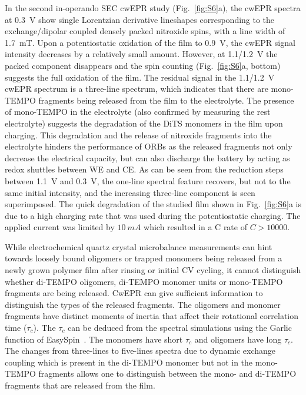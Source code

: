 \par
In the second in-operando SEC cwEPR study (Fig.~\ref{fig:S6}a), the cwEPR spectra at 0.3~V show single Lorentzian derivative lineshapes corresponding to the exchange/dipolar coupled densely packed nitroxide spins, with a line width of 1.7~mT. Upon a potentiostatic oxidation of the film to 0.9~V, the cwEPR signal intensity decreases by a relatively small amount. However, at 1.1/1.2~V the packed component disappears and the spin counting (Fig.~\ref{fig:S6}a, bottom) suggests the full oxidation of the film. The residual signal in the 1.1/1.2~V cwEPR spectrum is a three-line spectrum, which indicates that there are mono-TEMPO fragments being released from the film to the electrolyte. The presence of mono-TEMPO in the electrolyte (also confirmed by measuring the rest electrolyte) suggests the degradation of the DiTS monomers in the film upon charging. This degradation and the release of nitroxide fragments into the electrolyte hinders the performance of ORBs as the released fragments not only decrease the electrical capacity, but can also discharge the battery by acting as redox shuttles between WE and CE. As can be seen from the reduction steps between 1.1~V and 0.3~V, the one-line spectral feature recovers, but not to the same initial intensity, and the increasing three-line component is seen superimposed. The quick degradation of the studied film shown in Fig.~\ref{fig:S6}a is due to a high charging rate that was used during the potentiostatic charging. The applied current was limited by $10~mA$ which resulted in a C rate of $C>10000$.

\par
While electrochemical quartz crystal microbalance measurements can hint towards loosely bound oligomers or trapped monomers being released from a newly grown polymer film after rinsing or initial CV cycling, it cannot distinguish whether di-TEMPO oligomers, di-TEMPO monomer units or mono-TEMPO fragments are being released. CwEPR can give sufficient information to distinguish the types of the released fragments. The oligomers and monomer fragments have distinct moments of inertia that affect their rotational correlation time ($\tau_c$). The $\tau_c$ can be deduced from the spectral simulations using the Garlic function of EasySpin~\cite{Stoll2006}. The monomers have short $\tau_c$ and oligomers have long $\tau_c$. The changes from three-lines to five-lines spectra due to dynamic exchange coupling which is present in the di-TEMPO monomer but not in the mono-TEMPO fragments allows one to distinguish between the mono- and di-TEMPO fragments that are released from the film.

